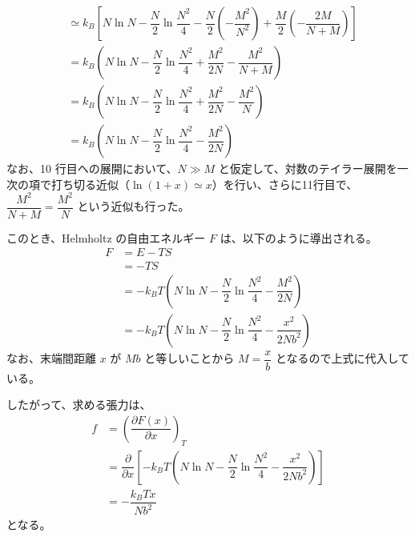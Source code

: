 \documentclass[uplatex,dvipdfmx,a4paper,11pt]{jsarticle}
\begin{document}
\begin{enumerate}
\begin{align*}
	&\simeq k_B \left[ N\ln N - \dfrac{N}{2} \ln \dfrac{N^2}{4} - \dfrac{N}{2}\left(-\dfrac{M^2}{N^2} \right) 
	+\dfrac{M}{2} \left(- \dfrac{2M}{N+M} \right) \right]  \\
	&= k_B \left( N\ln N - \dfrac{N}{2} \ln \dfrac{N^2}{4} + \dfrac{M^2}{2N} -\dfrac{M^2}{N+M} \right) \\
	&= k_B \left( N\ln N - \dfrac{N}{2} \ln \dfrac{N^2}{4} + \dfrac{M^2}{2N} -\dfrac{M^2}{N} \right) \\
	&= k_B \left( N\ln N - \dfrac{N}{2} \ln \dfrac{N^2}{4} - \dfrac{M^2}{2N} \right)
\end{align*}
なお、10 行目への展開において、$N \gg M$ と仮定して、対数のテイラー展開を一次の項で打ち切る近似（$\ln(1+x) \simeq x$）を行い、さらに11行目で、$\dfrac{M^2}{N+M} = \dfrac{M^2}{N}$ という近似も行った。

このとき、Helmholtz の自由エネルギー $F$ は、以下のように導出される。
\begin{align*}
F 	&= E - TS \\
	&= -TS \\
	&= -k_B T \left( N\ln N - \dfrac{N}{2} \ln \dfrac{N^2}{4} - \dfrac{M^2}{2N} \right) \\
	&= -k_B T \left( N\ln N - \dfrac{N}{2} \ln \dfrac{N^2}{4} - \dfrac{x^2}{2Nb^2} \right) 
\end{align*}
なお、末端間距離 $x$ が $Mb$ と等しいことから $M = \dfrac{x}{b}$ となるので上式に代入している。

したがって、求める張力は、
\begin{align*}
f 	&= \left(\dfrac{\partial F(x)}{\partial x} \right)_T \\
	&=\dfrac{\partial}{\partial x} \left[ -k_B T \left( N\ln N - \dfrac{N}{2} \ln \dfrac{N^2}{4} - \dfrac{x^2}{2Nb^2} \right) \right]\\
	&=- \dfrac{k_B T x}{Nb^2}
\end{align*}
となる。

\end{enumerate}

\newpage
\end{document}
